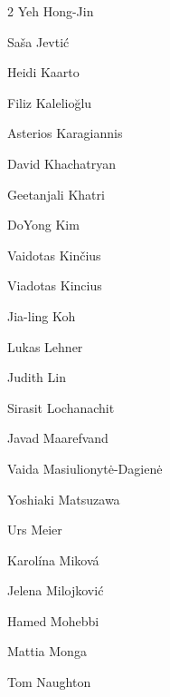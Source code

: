 \begin{multicols}{2}
 \ifdefined\AuthorHongJinYeh {} Yeh Hong-Jin\fi
 
 \ifdefined\AuthorJevticSasa {} Saša Jevtić\fi
 
 \ifdefined\AuthorKaartoHeidi {} Heidi Kaarto\fi
 
 \ifdefined\AuthorKaleliogluFiliz {} Filiz Kalelioğlu\fi
 
 \ifdefined\AuthorKaragiannisAsterios {} Asterios Karagiannis\fi
 
 \ifdefined\AuthorKhachatryanDavid {} David Khachatryan\fi
 
 \ifdefined\AuthorKhatriGeetanjali {} Geetanjali Khatri\fi
 
 \ifdefined\AuthorKimDoYong {} DoYong Kim\fi
 
 \ifdefined\AuthorKinciusVaidotas {} Vaidotas Kinčius\fi
 
 \ifdefined\AuthorKinciusViadotas {} Viadotas Kincius\fi
 
 \ifdefined\AuthorKohJialing {} Jia-ling Koh\fi
 
 \ifdefined\AuthorLehnerLukas {} Lukas Lehner\fi
 
 \ifdefined\AuthorLinJudith {} Judith Lin\fi
 
 \ifdefined\AuthorLochanachitSirasit {} Sirasit Lochanachit\fi
 
 \ifdefined\AuthorMaarefvandJavad {} Javad Maarefvand\fi
 
 \ifdefined\AuthorMasiulionyteDagieneVaida {} Vaida Masiulionytė-Dagienė\fi
 
 \ifdefined\AuthorMatsuzawaYoshiaki {} Yoshiaki Matsuzawa\fi
 
 \ifdefined\AuthorMeierUrs {} Urs Meier\fi
 
 \ifdefined\AuthorMikovaKarolina {} Karolína Miková\fi
 
 \ifdefined\AuthorMilojkovicJelena {} Jelena Milojković\fi
 
 \ifdefined\AuthorMohebbiHamed {} Hamed Mohebbi\fi
 
 \ifdefined\AuthorMongaMattia {} Mattia Monga\fi
 
 \ifdefined\AuthorNaughtonTom {} Tom Naughton\fi
 

\end{multicols}
